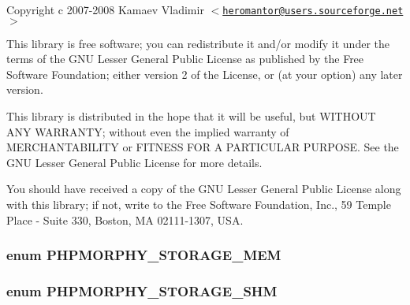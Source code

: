 Copyright c 2007-\/2008 Kamaev Vladimir $<$\href{mailto:heromantor@users.sourceforge.net}{\tt heromantor@users.sourceforge.net}$>$

This library is free software; you can redistribute it and/or modify it under the terms of the GNU Lesser General Public License as published by the Free Software Foundation; either version 2 of the License, or (at your option) any later version.

This library is distributed in the hope that it will be useful, but WITHOUT ANY WARRANTY; without even the implied warranty of MERCHANTABILITY or FITNESS FOR A PARTICULAR PURPOSE. See the GNU Lesser General Public License for more details.

You should have received a copy of the GNU Lesser General Public License along with this library; if not, write to the Free Software Foundation, Inc., 59 Temple Place -\/ Suite 330, Boston, MA 02111-\/1307, USA. \hypertarget{storage_8php_a4126b264540f27e3184b6055aabc707b}{
\subsubsection[{PHPMORPHY\_\-STORAGE\_\-MEM}]{\setlength{\rightskip}{0pt plus 5cm}enum {\bf PHPMORPHY\_\-STORAGE\_\-MEM}}}
\label{storage_8php_a4126b264540f27e3184b6055aabc707b}
\hypertarget{storage_8php_a4ba469b9fc911feb903abc91706fbb13}{
\subsubsection[{PHPMORPHY\_\-STORAGE\_\-SHM}]{\setlength{\rightskip}{0pt plus 5cm}enum {\bf PHPMORPHY\_\-STORAGE\_\-SHM}}}
\label{storage_8php_a4ba469b9fc911feb903abc91706fbb13}

